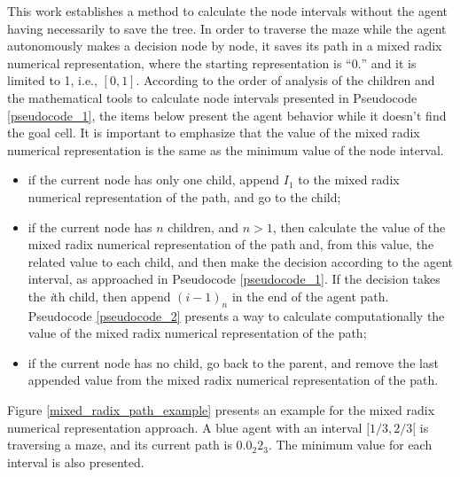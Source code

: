 This work establishes a method to calculate the node intervals without the agent having necessarily to save the tree. In order to traverse the maze while the agent autonomously makes a decision node by node, it saves its path in a mixed radix numerical representation, where the starting representation is ``$0.$'' and it is limited to 1, i.e., $[0,1]$. According to the order of analysis of the children and the mathematical tools to calculate node intervals presented in Pseudocode \ref{pseudocode_1}, the items below present the agent behavior while it doesn't find the goal cell. It is important to emphasize that the value of the mixed radix numerical representation is the same as the minimum value of the node interval.

\begin{itemize}
\item if the current node has only one child, append $I_{1}$ to the mixed radix numerical representation of the path, and go to the child;

\item if the current node has $n$ children, and $n > 1$, then calculate the value of the mixed radix numerical representation of the path and, from this value, the related value to each child, and then make the decision according to the agent interval, as approached in Pseudocode \ref{pseudocode_1}. If the decision takes the \textit{i}th child, then append $(i-1)_{n}$ in the end of the agent path. Pseudocode \ref{pseudocode_2} presents a way to calculate computationally the value of the mixed radix numerical representation of the path;

\item if the current node has no child, go back to the parent, and remove the last appended value from the mixed radix numerical representation of the path.
\end{itemize}

Figure \ref{mixed_radix_path_example} presents an example for the mixed radix numerical representation approach. A blue agent with an interval $[1/3,2/3[$ is traversing a maze, and its current path is $0.0_{2}2_{3}$. The minimum value for each interval is also presented.

